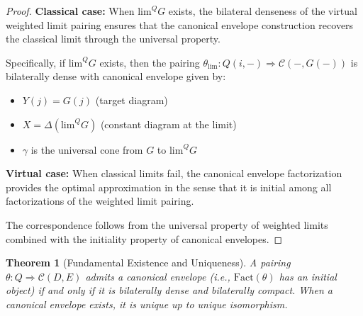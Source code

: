 \documentclass[11pt]{article}
\theoremstyle{plain}
\newtheorem{theorem}{Theorem}[section]
\theoremstyle{definition}
\theoremstyle{remark}
\newcommand{\C}{\mathcal{C}}
\renewcommand{\lim}{\mathrm{lim}}
\newcommand{\Fact}{\mathrm{Fact}}
\begin{document}
\begin{proof}
\textbf{Classical case:} When $\lim^Q G$ exists, the bilateral denseness of the virtual weighted limit pairing ensures that the canonical envelope construction recovers the classical limit through the universal property.

Specifically, if $\lim^Q G$ exists, then the pairing $\theta_{\lim} : Q(i,-) \Rightarrow \C(-, G(-))$ is bilaterally dense with canonical envelope given by:
\begin{itemize}
\item $Y(j) = G(j)$ (target diagram)
\item $X = \Delta(\lim^Q G)$ (constant diagram at the limit)
\item $\gamma$ is the universal cone from $G$ to $\lim^Q G$
\end{itemize}

\textbf{Virtual case:} When classical limits fail, the canonical envelope factorization provides the optimal approximation in the sense that it is initial among all factorizations of the weighted limit pairing.

The correspondence follows from the universal property of weighted limits combined with the initiality property of canonical envelopes.
\end{proof}

\begin{theorem}[Fundamental Existence and Uniqueness]
A pairing $\theta : Q \Rightarrow \C(D, E)$ admits a canonical envelope (i.e., $\Fact(\theta)$ has an initial object) if and only if it is bilaterally dense and bilaterally compact. When a canonical envelope exists, it is unique up to unique isomorphism.
\end{theorem}
\end{document}
